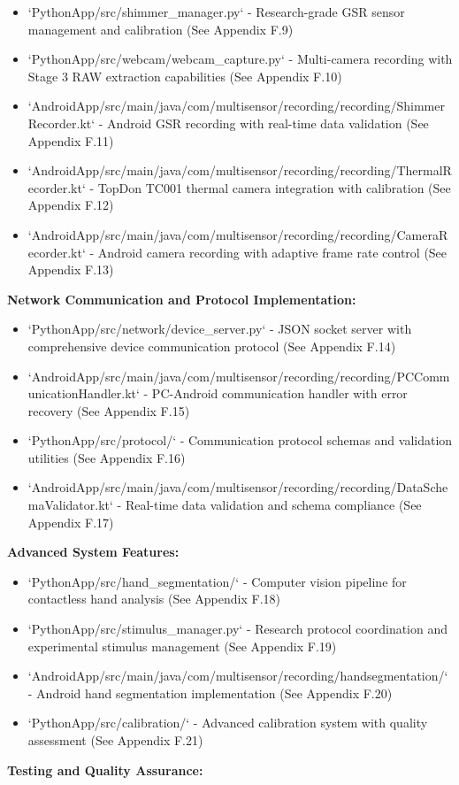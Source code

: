 \documentclass[12pt,a4paper]{report}
\begin{document}
\begin{itemize}
\item `PythonApp/src/shimmer_manager.py` - Research-grade GSR sensor management and calibration (See Appendix F.9)
\item `PythonApp/src/webcam/webcam_capture.py` - Multi-camera recording with Stage 3 RAW extraction capabilities (See
  Appendix F.10)
\item `AndroidApp/src/main/java/com/multisensor/recording/recording/ShimmerRecorder.kt` - Android GSR recording with
  real-time data validation (See Appendix F.11)
\item `AndroidApp/src/main/java/com/multisensor/recording/recording/ThermalRecorder.kt` - TopDon TC001 thermal camera
  integration with calibration (See Appendix F.12)
\item `AndroidApp/src/main/java/com/multisensor/recording/recording/CameraRecorder.kt` - Android camera recording with
  adaptive frame rate control (See Appendix F.13)

\end{itemize}
\textbf{Network Communication and Protocol Implementation:}

\begin{itemize}
\item `PythonApp/src/network/device_server.py` - JSON socket server with comprehensive device communication protocol (See
  Appendix F.14)
\item `AndroidApp/src/main/java/com/multisensor/recording/recording/PCCommunicationHandler.kt` - PC-Android communication
  handler with error recovery (See Appendix F.15)
\item `PythonApp/src/protocol/` - Communication protocol schemas and validation utilities (See Appendix F.16)
\item `AndroidApp/src/main/java/com/multisensor/recording/recording/DataSchemaValidator.kt` - Real-time data validation and
  schema compliance (See Appendix F.17)

\end{itemize}
\textbf{Advanced System Features:}

\begin{itemize}
\item `PythonApp/src/hand_segmentation/` - Computer vision pipeline for contactless hand analysis (See Appendix F.18)
\item `PythonApp/src/stimulus_manager.py` - Research protocol coordination and experimental stimulus management (See
  Appendix F.19)
\item `AndroidApp/src/main/java/com/multisensor/recording/handsegmentation/` - Android hand segmentation implementation (See
  Appendix F.20)
\item `PythonApp/src/calibration/` - Advanced calibration system with quality assessment (See Appendix F.21)

\end{itemize}
\textbf{Testing and Quality Assurance:}
\end{document}
